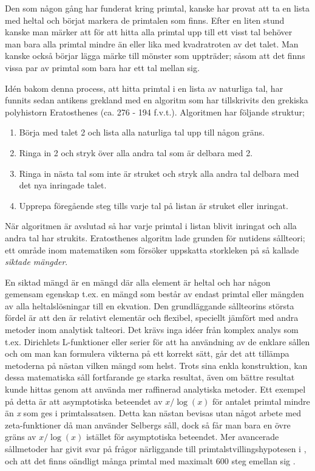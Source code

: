 Den som någon gång har funderat kring primtal, kanske har provat att ta en lista med heltal och börjat markera de primtalen som finns. 
Efter en liten stund kanske man märker att för att hitta alla primtal upp till ett visst tal behöver man bara alla primtal mindre än eller lika med kvadratroten av det talet. 
Man kanske också börjar lägga märke till mönster som uppträder; såsom att det finns vissa par av primtal som bara har ett tal mellan sig. 

Idén bakom denna process, att hitta primtal i en lista av naturliga tal, har funnits sedan antikens grekland med en algoritm som har tillskrivits den grekiska polyhistorn Eratosthenes (ca. 276 - 194 f.v.t.). Algoritmen har följande struktur;
\begin{enumerate}
    \item Börja med talet 2 och lista alla naturliga tal upp till någon gräns.
    \item Ringa in 2 och stryk över alla andra tal som är delbara med 2.
    \item Ringa in nästa tal som inte är struket och stryk alla andra tal delbara med det nya inringade talet.
    \item Upprepa föregående steg tills varje tal på listan är struket eller inringat. 
\end{enumerate}
När algoritmen är avslutad så har varje primtal i listan blivit inringat och alla andra tal har strukits. 
Eratosthenes algoritm lade grunden för nutidens sållteori; ett område inom matematiken som försöker uppskatta storkleken på så kallade \textit{siktade mängder}. 

En siktad mängd är en mängd där alla element är heltal och har någon gemensam egenskap t.ex. en mängd som består av endast primtal eller mängden av alla heltalslösningar till en ekvation. 
Den grundläggande sållteorins största fördel är att den är relativt elementär och flexibel, speciellt jämfört med andra metoder inom analytisk talteori. 
Det krävs inga idéer från komplex analys som t.ex. Dirichlets L-funktioner eller serier för att ha användning av de enklare sållen och om man kan formulera vikterna på ett korrekt sätt, går det att tillämpa metoderna på nästan vilken mängd som helst. 
Trots sina enkla konstruktion, kan dessa matematiska såll fortfarande ge starka resultat, även om bättre resultat kunde hittas genom att använda mer raffinerad analytiska metoder. 
Ett exempel på detta är att asymptotiska beteendet av \(x/\log(x)\) för antalet primtal mindre än \textit{x} som ges i primtalssatsen. 
Detta kan nästan bevisas utan något arbete med zeta-funktioner då man använder Selbergs såll, dock så får man bara en övre gräns av \(x/\log(x)\) istället för asymptotiska beteendet. 
Mer avancerade sållmetoder har givit svar på frågor närliggande till primtalstvillingshypotesen i \cite{chen2Prime}, och att det finns oändligt många primtal med maximalt 600 steg emellan sig \cite{mayBound}.


